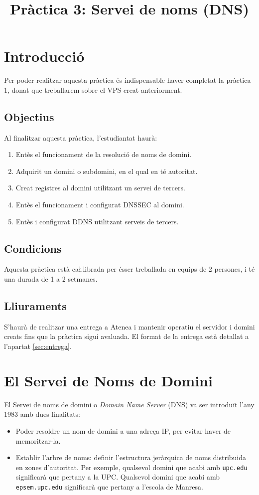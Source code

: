 \documentclass{practicaitic}
\title{Pràctica 3: Servei de noms (DNS)}
\begin{document}
\section{Introducció}

Per poder realitzar aquesta pràctica és indispensable haver completat la
pràctica 1, donat que treballarem sobre el VPS creat anteriorment.

\subsection{Objectius}

Al finalitzar aquesta pràctica, l'estudiantat haurà:
\begin{enumerate}
  \item Entès el funcionament de la resolució de noms de domini.
  \item Adquirit un domini o subdomini, en el qual en té autoritat.
  \item Creat registres al domini utilitzant un servei de tercers.
  \item Entès el funcionament i configurat DNSSEC al domini.
  \item Entès i configurat DDNS utilitzant serveis de tercers.
\end{enumerate}

\subsection{Condicions}

Aquesta pràctica està ca\l.librada per ésser treballada en equips de 2 persones,
i té una durada de 1 a 2 setmanes.

\subsection{Lliuraments}

S'haurà de realitzar una entrega a Atenea i mantenir operatiu el servidor 
i domini creats fins que la pràctica sigui avaluada. El format de la entrega està detallat a
l'apartat \ref{sec:entrega}.

\section{El Servei de Noms de Domini}

El Servei de noms de domini o \textit{Domain Name Server} (DNS) va ser introduït
l'any 1983 amb dues finalitats:

\begin{itemize}
  \item Poder resoldre un nom de domini a una adreça IP, per evitar haver de
  memoritzar-la.
  \item Establir l'arbre de noms: definir l'estructura jeràrquica de noms distribuida
  en zones d'autoritat. Per exemple, qualsevol domini que acabi amb \texttt{upc.edu}
  significarà que pertany a la UPC. Qualsevol domini que acabi amb \texttt{epsem.upc.edu}
  significarà que pertany a l'escola de Manresa.
\end{itemize}
\end{document}

